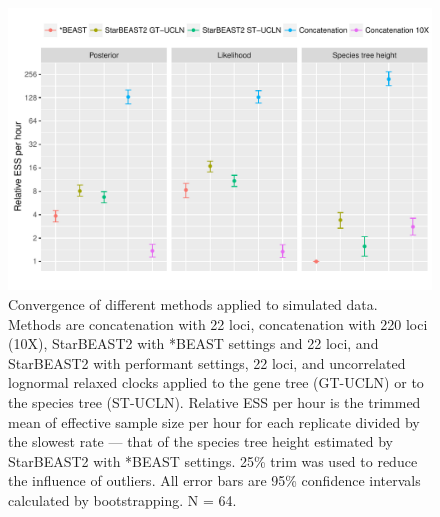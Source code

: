 \documentclass[12pt]{article}
\begin{document}
\begin{figure}[htb!]
\centering
\includegraphics[width=16cm]{multiple_ess_per_hour.pdf}
\caption
{Convergence of different methods applied to simulated data. Methods are
concatenation with 22 loci, concatenation with 220 loci (10X), StarBEAST2 with
*BEAST settings and 22 loci, and StarBEAST2 with performant settings, 22 loci,
and uncorrelated lognormal relaxed clocks applied to the gene tree (GT-UCLN) or
to the species tree (ST-UCLN). Relative ESS per hour is the trimmed mean of
effective sample size per hour for each replicate divided by the slowest rate
--- that of the species tree height estimated by StarBEAST2 with *BEAST
settings. 25\% trim was used to reduce the influence of
outliers. All error bars are 95\% confidence intervals calculated by
bootstrapping. N = 64.}
\label{fig:simulatedEssPerHour}
\end{figure}

\clearpage
\end{document}

